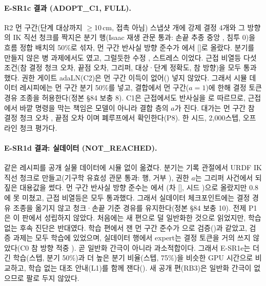 \paragraph{E-SR1c 결과 (ADOPT\_C1, FULL).} R2 먼 구간(단계 대상까지 $\ge$10\,cm, 접촉 아님) 스냅샷 개에 강제 결정 4개와 그 방향의 IK 직선 청크를 짝지은 분기 행(Isaac 재생 관문 통과: 손끝 추종 중앙 , 침투 0)을 흐름 정합 배치의 50\%로 섞자, 먼 구간 반사실 방향 준수가 에서  []로 올랐다. 분기를 만들지 않은 병 과제에서도 였고, 그럴듯한 수정 , 스트레스 이었다. 근접 비열등 다섯 조건(참 결정 청크 오차, 끝점 오차, 그리퍼, 대상·단계 정확도, 참 방향)을 모두 통과했다. 권한 게이트 adaLN(C2)은 먼 구간 이득이 없어() 넣지 않았다. 그래서 시뮬 데이터 레시피에는 먼 구간 분기 50\%를 넣고, 결합에서 먼 구간($a{=}1$)에 한해 결정 토큰 경유 조종을 허용한다(정본 §84 보충 8). C1은 근접에서도 반사실을 로 따르므로, 근접에서 바깥 명령을 막는 책임은 모델이 아니라 결합 층의 $a$가 진다. 대가는 먼 구간 참 결정 청크 오차 , 끝점 오차 이며 폐루프에서 확인한다(P8). 한 시드, 2,000스텝, 오프라인 청크 평가다.

\paragraph{E-SR1d 결과: 실데이터 (NOT\_REACHED).} 같은 레시피를 공개 실물 데이터에 시뮬 없이 옮겼다. 분기는 기록 관절에서 URDF IK 직선 청크로 만들고(기구학 유효성 관문 통과: 행, 거부 ), 권한 $a$는 그리퍼 사건에서 되짚은 대용값을 썼다. 먼 구간 반사실 방향 준수는 에서 (차  [], 시드 )으로 올랐지만 0.8에 못 미쳤고, 근접 비열등은 모두 통과했다. 그래서 실데이터 체크포인트에는 결정 경유 조종을 옮기지 않고 청크·손끝 기준 경유를 유지한다(정본 §84 보충 10). 전제 P1은 이 판에서 성립하지 않았다. 처음에는 새 편으로 덜 일반화한 것으로 읽었지만, 학습 없는 후속 진단은 반대였다. 학습 편에서 잰 먼 구간 준수가 으로 검증()과 같았고, 검증 과제는 모두 학습에 있었으며, 실데이터 행에서 expert는 결정 토큰을 거의 쓰지 않았다(C0 참 방향 적중 ). 곧 일반화 간극이 아니라 과소적합이다. 그래서 E-SR1e는 더 긴 학습(스텝, 분기 50\%)과 더 높은 분기 비율(스텝, 75\%)을 비슷한 GPU 시간으로 비교하고, 학습 없는 대조 안내(L1)를 함께 잰다(). 새 공개 편(RB3)은 일반화 간극이 없으므로 팔로 두지 않았다.

